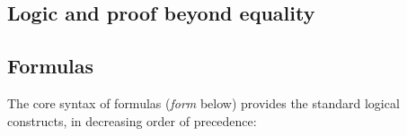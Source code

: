 %
\begin{isabellebody}%
\def\isabellecontext{Logic}%
%
\isadelimtheory
%
\endisadelimtheory
%
\isatagtheory
%
\endisatagtheory
{\isafoldtheory}%
%
\isadelimtheory
%
\endisadelimtheory
%
\begin{isamarkuptext}%
\vspace{-5ex}
\section{Logic and proof beyond equality}
\label{sec:Logic}

\subsection{Formulas}

The core syntax of formulas (\textit{form} below)
provides the standard logical constructs, in decreasing order of precedence:
\[
\begin{array}{rcl}


\end{array}\]
\end{isamarkuptext}
\end{isabellebody}
